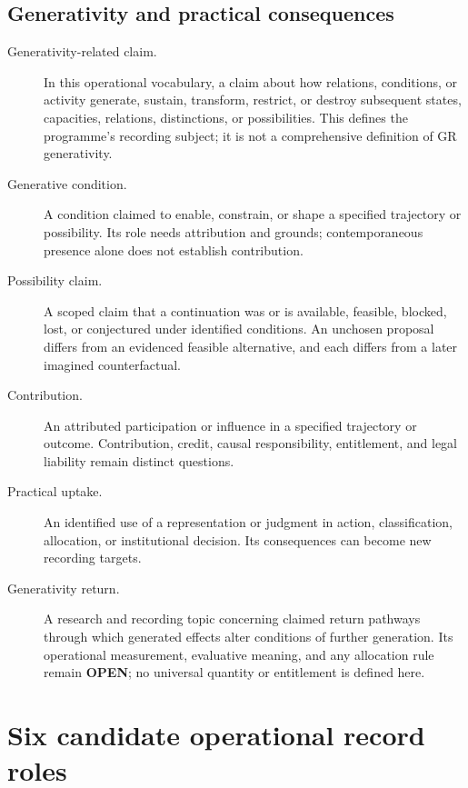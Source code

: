 \documentclass[11pt,a4paper]{article}
\begin{document}
\subsection{Generativity and practical consequences}
\begin{description}
\item[Generativity-related claim.] In this operational vocabulary, a claim about how relations, conditions, or activity generate, sustain, transform, restrict, or destroy subsequent states, capacities, relations, distinctions, or possibilities. This defines the programme's recording subject; it is not a comprehensive definition of GR generativity.
\item[Generative condition.] A condition claimed to enable, constrain, or shape a specified trajectory or possibility. Its role needs attribution and grounds; contemporaneous presence alone does not establish contribution.
\item[Possibility claim.] A scoped claim that a continuation was or is available, feasible, blocked, lost, or conjectured under identified conditions. An unchosen proposal differs from an evidenced feasible alternative, and each differs from a later imagined counterfactual.
\item[Contribution.] An attributed participation or influence in a specified trajectory or outcome. Contribution, credit, causal responsibility, entitlement, and legal liability remain distinct questions.
\item[Practical uptake.] An identified use of a representation or judgment in action, classification, allocation, or institutional decision. Its consequences can become new recording targets.
\item[Generativity return.] A research and recording topic concerning claimed return pathways through which generated effects alter conditions of further generation. Its operational measurement, evaluative meaning, and any allocation rule remain \textbf{OPEN}; no universal quantity or entitlement is defined here.
\end{description}


\section{Six candidate operational record roles}
\end{document}
